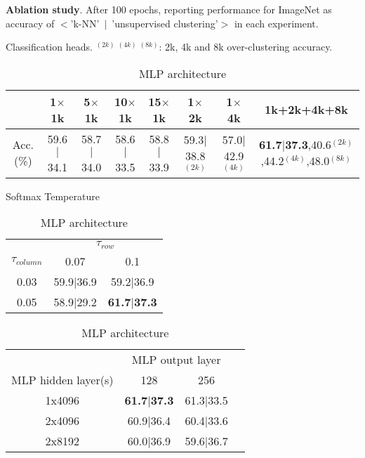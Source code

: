 \documentclass[runningheads]{llncs}
\begin{document}
\begin{table}[!htb]
    \caption{\textbf{Ablation study}. 
    After 100 epochs, reporting performance for ImageNet as accuracy of $<$'k-NN'~$\vert$~'unsupervised clustering'$>$ in each experiment.
    }
    
    \begin{subtable}{\linewidth}
      \centering
        \caption{Classification heads. $^{(2k)}~^{(4k)}~^{(8k)}$: 2k, 4k and 8k over-clustering accuracy.}
        \tiny
        \label{table:ablation_num_cls}
        \begin{tabular}{c|ccccccc}
        \toprule
         & 1$\times$1k & 5$\times$1k & 10$\times$1k & 15$\times$1k & 1$\times$2k & 1$\times$4k & 1k+2k+4k+8k \\
        \midrule
        Acc. (\%) & 59.6$\vert$34.1 & 58.7$\vert$34.0 & 58.6$\vert$33.5 & 58.8$\vert$33.9 & 59.3$\vert$38.8$^{(2k)}$ & 57.0$\vert$42.9$^{(4k)}$ &  \textbf{61.7}$\vert$\textbf{37.3},40.6$^{(2k)}$,44.2$^{(4k)}$,48.0$^{(8k)}$\\
        \bottomrule
        \end{tabular}
    \end{subtable}
    
    \begin{subtable}{.38\linewidth}
      \centering
        \caption{Softmax Temperature}
        \label{table:ablation_sm_temp}
        \begin{tabular}{c|cc}
        \toprule
         & \multicolumn{2}{c}{$\tau_{row}$} \\
        $\tau_{column}$ & 0.07 & 0.1 \\
        \midrule
        0.03 & 59.9$\vert$36.9 & 59.2$\vert$36.9 \\
        0.05 & 58.9$\vert$29.2 & \textbf{61.7}$\vert$\textbf{37.3} \\
        \bottomrule
        \end{tabular}
    \end{subtable}\hfill \begin{subtable}{.62\linewidth}
      \centering
        \caption{MLP architecture}
        \label{table:ablation_mlp}
        \begin{tabular}{c|ccc}
        \toprule
         & \multicolumn{2}{c}{MLP output layer} \\
        MLP hidden layer(s) & 128 & 256 \\
        \midrule
        1x4096 & \textbf{61.7}$\vert$\textbf{37.3} & 61.3$\vert$33.5 \\
        2x4096 & 60.9$\vert$36.4 & 60.4$\vert$33.6 \\
        2x8192 & 60.0$\vert$36.9 & 59.6$\vert$36.7 \\
        \bottomrule
        \end{tabular}
    \end{subtable}


\end{table}
\end{document}
